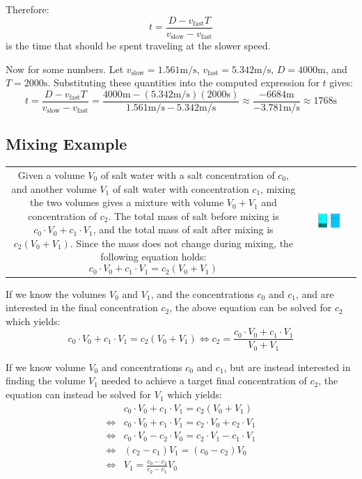 \documentclass{article}
\begin{document}
Therefore:
\[t = \frac{D - v_\text{fast}T}{v_\text{slow} - v_\text{fast}}\]
is the time that should be spent traveling at the slower speed. 

Now for some numbers. Let \(v_\text{slow} = 1.561\text{m/s}\), \(v_\text{fast} = 5.342\text{m/s}\), \(D = 4000\text{m}\), and \(T = 2000\text{s}\). Substituting these quantities into the computed expression for \(t\) gives:
\[t = \frac{D - v_\text{fast}T}{v_\text{slow} - v_\text{fast}} = \frac{4000\text{m} - (5.342\text{m/s})(2000\text{s})}{1.561\text{m/s} - 5.342\text{m/s}} \approx \frac{-6684\text{m}}{-3.781\text{m/s}} \approx 1768\text{s}\]


\subsection{Mixing Example}

\begin{tabular}{cc}
\parbox{0.5\textwidth}{
Given a volume \(V_0\) of salt water with a salt concentration of \(c_0\), and another volume \(V_1\) of salt water with concentration \(c_1\), mixing the two volumes gives a mixture with volume \(V_0 + V_1\) and concentration of \(c_2\). The total mass of salt before mixing is \(c_0 \cdot V_0 + c_1 \cdot V_1\), and the total mass of salt after mixing is \(c_2(V_0 + V_1)\). Since the mass does not change during mixing, the following equation holds:
\[c_0 \cdot V_0 + c_1 \cdot V_1 = c_2(V_0 + V_1)\]
} & \parbox{0.5\textwidth}{
\includegraphics[width = 0.5\textwidth]{mixing_example}
}
\end{tabular}

If we know the volumes \(V_0\) and \(V_1\), and the concentrations \(c_0\) and \(c_1\), and are interested in the final concentration \(c_2\), the above equation can be solved for \(c_2\) which yields: 
\[c_0 \cdot V_0 + c_1 \cdot V_1 = c_2(V_0 + V_1) \iff c_2 = \frac{c_0 \cdot V_0 + c_1 \cdot V_1}{V_0 + V_1}\]

If we know volume \(V_0\) and concentrations \(c_0\) and \(c_1\), but are instead interested in finding the volume \(V_1\) needed to achieve a target final concentration of \(c_2\), the equation can instead be solved for \(V_1\) which yields:
\begin{align*}
& c_0 \cdot V_0 + c_1 \cdot V_1 = c_2(V_0 + V_1) \\
\iff & c_0 \cdot V_0 + c_1 \cdot V_1 = c_2 \cdot V_0 + c_2 \cdot V_1 \\
\iff & c_0 \cdot V_0 - c_2 \cdot V_0 = c_2 \cdot V_1 - c_1 \cdot V_1 \\
\iff & (c_2 - c_1)V_1 = (c_0 - c_2)V_0 \\
\iff & V_1 = \frac{c_0 - c_2}{c_2 - c_1}V_0
\end{align*}
\end{document}
